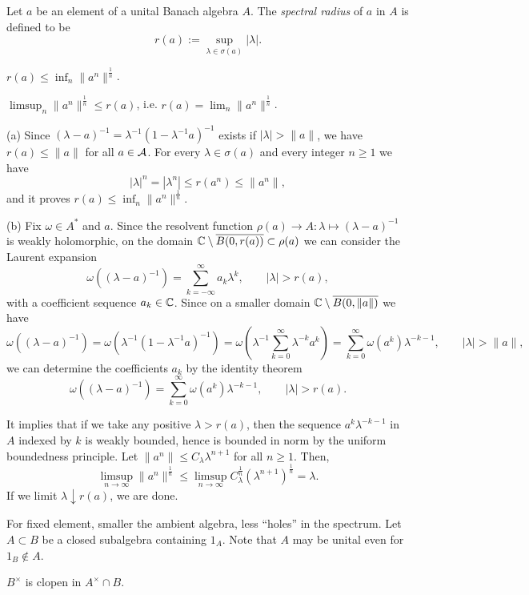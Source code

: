 \documentclass{../../large}
\begin{document}
\begin{prb}
Let $a$ be an element of a unital Banach algebra $A$.
The \emph{spectral radius} of $a$ in $A$ is defined to be
\[r(a):=\sup_{\lambda\in\sigma(a)}|\lambda|.\]
\begin{parts}
\item $r(a)\le\inf_n\|a^n\|^{\frac1n}$.
\item $\limsup_n\|a^n\|^{\frac1n}\le r(a)$, i.e. $r(a)=\lim_n\|a^n\|^{\frac1n}$.
\end{parts}
\end{prb}
\begin{pf}
(a)
Since $(\lambda-a)^{-1}=\lambda^{-1}(1-\lambda^{-1}a)^{-1}$ exists if $|\lambda|>\|a\|$, we have $r(a)\le\|a\|$ for all $a\in\mathcal{A}$.
For every $\lambda\in\sigma(a)$ and every integer $n\ge1$ we have
\[|\lambda|^n=|\lambda^n|\le r(a^n)\le\|a^n\|,\]
and it proves $r(a)\le\inf_n\|a^n\|^{\frac1n}$.

(b)
Fix $\omega\in A^*$ and $a$.
Since the resolvent function $\rho(a)\to A:\lambda\mapsto(\lambda-a)^{-1}$ is weakly holomorphic, on the domain $\mathbb{C}\setminus\overline{B(0,r(a))}\subset\rho(a)$ we can consider the Laurent expansion
\[\omega((\lambda-a)^{-1})=\sum_{k=-\infty}^\infty a_k\lambda^k,\qquad|\lambda|>r(a),\]
with a coefficient sequence $a_k\in\mathbb{C}$.
Since on a smaller domain $\mathbb{C}\setminus\overline{B(0,\|a\|)}$ we have
\[\omega((\lambda-a)^{-1})=\omega(\lambda^{-1}(1-\lambda^{-1}a)^{-1})=\omega(\lambda^{-1}\sum_{k=0}^\infty\lambda^{-k}a^k)=\sum_{k=0}^\infty\omega(a^k)\lambda^{-k-1},\qquad|\lambda|>\|a\|,\]
we can determine the coefficients $a_k$ by the identity theorem
\[\omega((\lambda-a)^{-1})=\sum_{k=0}^\infty\omega(a^k)\lambda^{-k-1},\qquad|\lambda|>r(a).\]

It implies that if we take any positive $\lambda>r(a)$, then the sequence $a^k\lambda^{-k-1}$ in $A$ indexed by $k$ is weakly bounded, hence is bounded in norm by the uniform boundedness principle.
Let $\|a^n\|\le C_\lambda\lambda^{n+1}$ for all $n\ge1$.
Then,
\[\limsup_{n\to\infty}\|a^n\|^{\frac1n}\le\limsup_{n\to\infty}C_\lambda^{\frac1n}(\lambda^{n+1})^{\frac1n}=\lambda.\]
If we limit $\lambda\downarrow r(a)$, we are done.
\end{pf}

\begin{prb}
For fixed element, smaller the ambient algebra, less ``holes'' in the spectrum.
Let $A\subset B$ be a closed subalgebra containing $1_A$.
Note that $A$ may be unital even for $1_B\notin A$.
\begin{parts}
\item $B^\times$ is clopen in $A^\times\cap B$.
\end{parts}
\end{prb}
\end{document}
